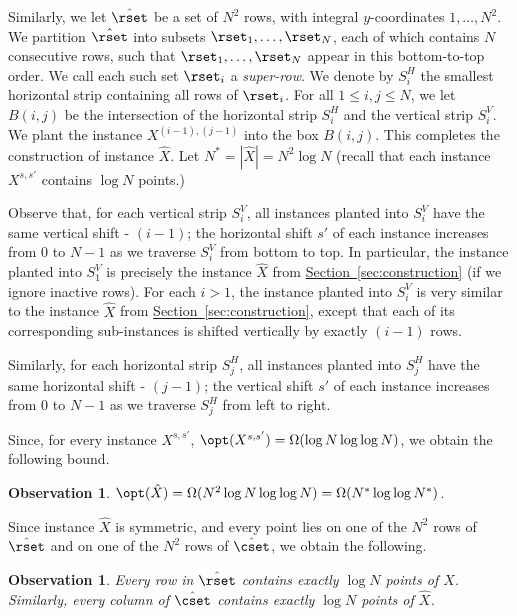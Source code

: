 \documentclass[11pt]{article}
\numberwithin{equation}{section}
\theoremstyle{definition}
\theoremstyle{plain}
\newcommand{\expref}[2]{\hyperref[#2]{#1~\ref{#2}}}
\newtheorem{myobs}[theorem]{Observation}
\begin{document}
Similarly, we let $\hat \rset$ be a set of $N^2$ rows, with integral $y$-coordinates $1,\ldots,N^2$. We partition $\hat \rset$ into subsets $\rset_1,\ldots,\rset_N$, each of which contains $N$ consecutive rows, such that $\rset_1,\ldots,\rset_N$ appear in this bottom-to-top order. We call each such set $\rset_i$ a \emph{super-row}.  We denote by $S^H_i$ the smallest horizontal strip containing all rows of $\rset_i$.
For all $1\leq i,j\leq N$, we let $B(i,j)$ be the intersection of the horizontal strip $S^H_i$ and the vertical strip $S^V_i$. We plant the instance $X^{(i-1),(j-1)}$ into the box $B(i,j)$. 
This completes the construction of instance $\hat{X}$. 
Let $N^* = |\hat{X}| = N^2 \log N$ (recall that  each instance $X^{s,s'}$ contains $\log N$ points.) 


Observe that, for each vertical strip $S^V_i$, all instances planted into $S^V_i$ have the same vertical shift - $(i-1)$; the horizontal shift $s'$ of each instance increases from $0$ to $N-1$ as we traverse $S^V_i$ from bottom to top. 
In particular, the instance planted into $S^V_1$ is precisely the instance $\hat X$ from \expref{Section}{sec:construction} (if we ignore inactive rows).  
For each $i>1$, the instance planted into $S^V_i$ is very similar to the instance  $\hat X$ from \expref{Section}{sec:construction}, except that each of its corresponding sub-instances is shifted vertically by exactly $(i-1)$ rows.

Similarly, for each horizontal strip  $S^H_j$, all instances planted into $S^H_j$ have the same horizontal shift - $(j-1)$; the vertical shift $s'$ of each instance increases from $0$ to $N-1$ as we traverse $S^H_j$ from left to right.


Since, for every  instance $X^{s,s'}$, $\opt(X^{s,s'})=\Omega(\log N\log\log N)$, we obtain the following bound.
%
\begin{myobs} 
 $\opt(\hat X)=\Omega(N^2\log N\log\log N)=\Omega(N^*\log\log N^*)$. 
\end{myobs} 

Since instance $\hat X$ is symmetric, and every point lies on one of the $N^2$ rows of $\hat\rset$ and on one of the $N^2$ rows of $\hat\cset$, we obtain the following.

\begin{myobs} 
Every row in $\hat\rset$ contains exactly $\log N$ points of $\hat X$. Similarly, every column of $\hat\cset$  contains exactly $\log N$ points of $\hat X$.
\end{myobs} 
\end{document}
